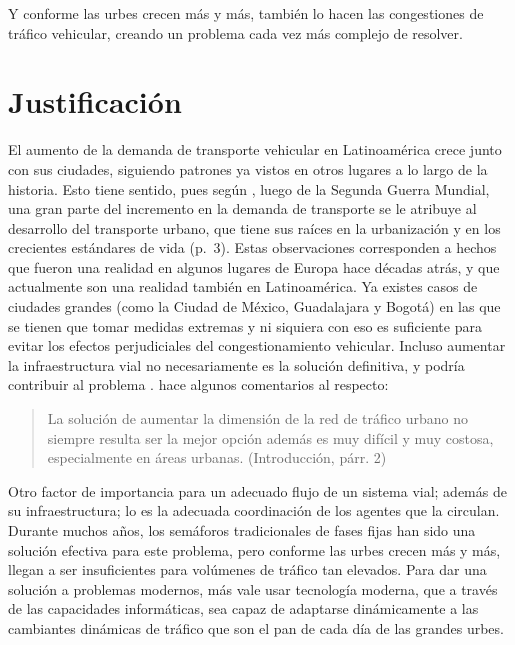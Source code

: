 Y conforme las urbes crecen más y más, también lo hacen las congestiones
de tráfico vehicular, creando un problema cada vez más complejo de
resolver.

\hypertarget{justificaciuxf3n}{%
\section{Justificación}\label{justificaciuxf3n}}

El aumento de la demanda de transporte vehicular en Latinoamérica crece
junto con sus ciudades, siguiendo patrones ya vistos en otros lugares a
lo largo de la historia. Esto tiene sentido, pues según
\textcite{Patriksson2012}, luego de la Segunda Guerra Mundial, una gran
parte del incremento en la demanda de transporte se le atribuye al
desarrollo del transporte urbano, que tiene sus raíces en la
urbanización y en los crecientes estándares de vida (p.~3). Estas
observaciones corresponden a hechos que fueron una realidad en algunos
lugares de Europa hace décadas atrás, y que actualmente son una realidad
también en Latinoamérica. Ya existes casos de ciudades grandes (como la
Ciudad de México, Guadalajara y Bogotá) en las que se tienen que tomar
medidas extremas y ni siquiera con eso es suficiente para evitar los
efectos perjudiciales del congestionamiento vehicular. Incluso aumentar
la infraestructura vial no necesariamente es la solución definitiva, y
podría contribuir al problema \parencite[124-126]{Galindo2006}.
\textcite{JoelTrejo2006} hace algunos comentarios al respecto:

\begin{quote}
La solución de aumentar la dimensión de la red de tráfico urbano no
siempre resulta ser la mejor opción además es muy difícil y muy costosa,
especialmente en áreas urbanas. (Introducción, párr. 2)
\end{quote}

 Otro factor de importancia para un adecuado flujo de un sistema vial;
además de su infraestructura; lo es la adecuada coordinación de los
agentes que la circulan. Durante muchos años, los semáforos
tradicionales de fases fijas han sido una solución efectiva para este
problema, pero conforme las urbes crecen más y más, llegan a ser
insuficientes para volúmenes de tráfico tan elevados. Para dar una
solución a problemas modernos, más vale usar tecnología moderna, que a
través de las capacidades informáticas, sea capaz de adaptarse
dinámicamente a las cambiantes dinámicas de tráfico que son el pan de
cada día de las grandes urbes.

